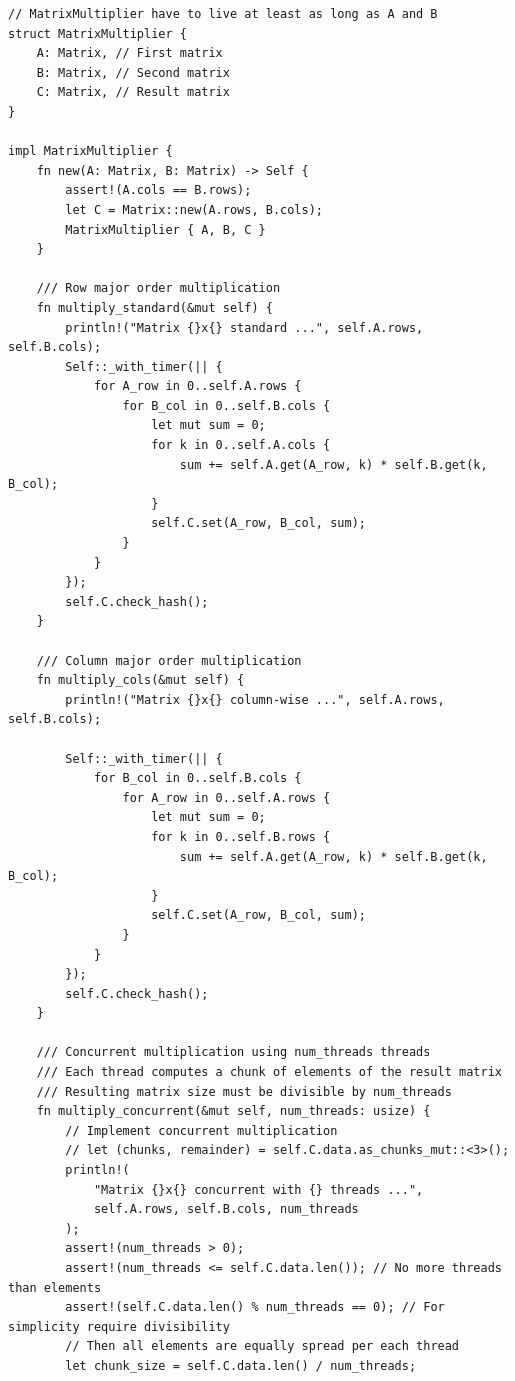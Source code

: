 \documentclass[a4paper, 14pt]{extarticle}
\begin{document}
\begin{lstlisting}[caption={Исходный код программы}, label={lst:source_code}]
// MatrixMultiplier have to live at least as long as A and B
struct MatrixMultiplier {
    A: Matrix, // First matrix
    B: Matrix, // Second matrix
    C: Matrix, // Result matrix
}

impl MatrixMultiplier {
    fn new(A: Matrix, B: Matrix) -> Self {
        assert!(A.cols == B.rows);
        let C = Matrix::new(A.rows, B.cols);
        MatrixMultiplier { A, B, C }
    }

    /// Row major order multiplication
    fn multiply_standard(&mut self) {
        println!("Matrix {}x{} standard ...", self.A.rows, self.B.cols);
        Self::_with_timer(|| {
            for A_row in 0..self.A.rows {
                for B_col in 0..self.B.cols {
                    let mut sum = 0;
                    for k in 0..self.A.cols {
                        sum += self.A.get(A_row, k) * self.B.get(k, B_col);
                    }
                    self.C.set(A_row, B_col, sum);
                }
            }
        });
        self.C.check_hash();
    }

    /// Column major order multiplication
    fn multiply_cols(&mut self) {
        println!("Matrix {}x{} column-wise ...", self.A.rows, self.B.cols);

        Self::_with_timer(|| {
            for B_col in 0..self.B.cols {
                for A_row in 0..self.A.rows {
                    let mut sum = 0;
                    for k in 0..self.B.rows {
                        sum += self.A.get(A_row, k) * self.B.get(k, B_col);
                    }
                    self.C.set(A_row, B_col, sum);
                }
            }
        });
        self.C.check_hash();
    }

    /// Concurrent multiplication using num_threads threads
    /// Each thread computes a chunk of elements of the result matrix
    /// Resulting matrix size must be divisible by num_threads
    fn multiply_concurrent(&mut self, num_threads: usize) {
        // Implement concurrent multiplication
        // let (chunks, remainder) = self.C.data.as_chunks_mut::<3>();
        println!(
            "Matrix {}x{} concurrent with {} threads ...",
            self.A.rows, self.B.cols, num_threads
        );
        assert!(num_threads > 0);
        assert!(num_threads <= self.C.data.len()); // No more threads than elements
        assert!(self.C.data.len() % num_threads == 0); // For simplicity require divisibility
        // Then all elements are equally spread per each thread
        let chunk_size = self.C.data.len() / num_threads;


\end{lstlisting}
\end{document}
